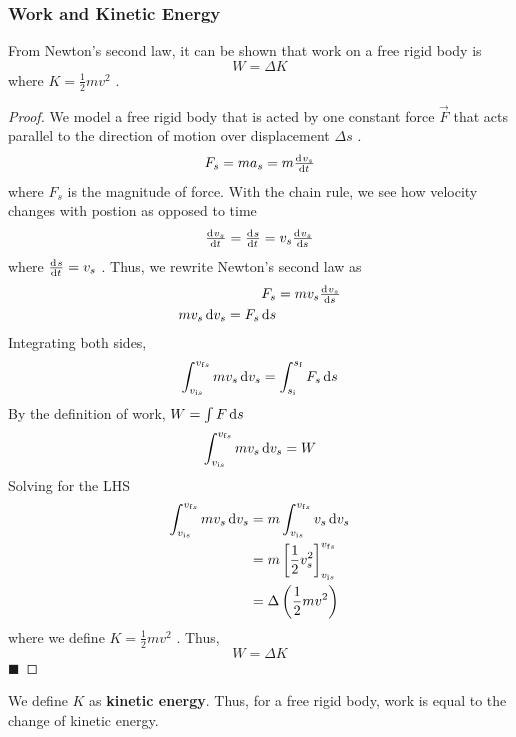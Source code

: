 \subsubsection{Work and Kinetic Energy}

From Newton's second law, it can be shown that work on a free rigid body
is
\begin{equation}
    W = \Delta K
\end{equation}
where
$
    K = \frac{1}{2}mv^2
$%
.
\begin{proof}
    We model a free rigid body that is acted by one constant force
    $
        \vec{F}
    $ that acts parallel to the direction of motion over displacement
    $
        \Delta s
    $%
    .
    \begin{equation}
        F_s=ma_s=m\od{v_s}{t}
    \end{equation}
    where
    $
        F_s
    $ is the magnitude of force.  With the chain rule, we see how
    velocity changes with postion as opposed to time
    \begin{equation}
        \od{v_s}{t}=\od{s}{t}=v_s\od{v_s}{s}
    \end{equation}
    where
    $
        \od{s}{t} = v_s
    $%
.    Thus, we rewrite Newton's second law as
    \begin{align}
        F_s &= mv_s\od{v_s}{s} \\
        mv_s \dif v_s = F_s \dif s
    \end{align}
    Integrating both sides,
    \begin{equation}
        \int_{v_{\ini s}}^{v_{\fin s}} mv_s \dif v_s = \int_{s_\ini}^{s_\fin}
        F_s \dif s
    \end{equation}
    By the definition of work,
    $
        W=\int F \dif s
    $
    \begin{equation}
        \int_{v_{\ini s}}^{v_{\fin s}} mv_s \dif v_s = W
    \end{equation}
    Solving for the LHS
    \begin{align}
        \int_{v_{\ini s}}^{v_{\fin s}} mv_s \dif v_s &= m \int_{v_{\ini
        s}}^{v_{\fin s}} v_s \dif v_s \\
        &= m\left[\frac{1}{2} v_s^2\right]_{v_{\ini s}}^{v_{\fin s}} \\
        &=\Delta\left(\frac{1}{2} mv^2 \right)
    \end{align}
    where we define
    $
        K=\frac{1}{2}mv^2
    $%
.    Thus,
    \begin{equation}
        W = \Delta K
    \end{equation}
    $
        \blacksquare
    $
\end{proof}
We define
$
    K
$ as \textbf{kinetic energy}.  Thus, for a free rigid body, work is
equal to the change of kinetic energy.

